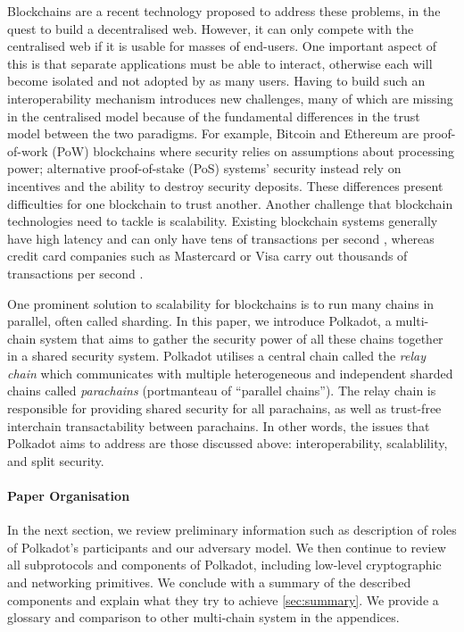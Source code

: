 Blockchains are a recent technology proposed to address these problems, in the quest to build a decentralised web. However, it can only compete with the centralised web if it is usable for masses of end-users. One important aspect of this is that separate applications must be able to interact, otherwise each will become isolated and not adopted by as many users. Having to build such an interoperability mechanism introduces new challenges, many of which are missing in the centralised model because of the fundamental differences in the trust model between the two paradigms.
For example, Bitcoin\cite{nakamoto2008bitcoin} and Ethereum\cite{buterin2014ethereum} are proof-of-work (PoW) blockchains where security relies on assumptions about processing power; alternative proof-of-stake (PoS) systems' security instead rely on incentives and the ability to destroy security deposits. These differences present difficulties for one blockchain to trust another. Another challenge that blockchain technologies need to tackle is scalability. Existing blockchain systems generally have high latency and can only have tens of transactions per second \cite{scaling}, whereas credit card companies such as Mastercard or Visa carry out thousands of transactions per second \cite{Kenny2020Visa, Visa2020}.

One prominent solution to scalability for blockchains is to run many chains in parallel, often called sharding. %
In this paper, we introduce Polkadot, a multi-chain system that aims to gather the security power of all these chains together in a shared security system. Polkadot utilises a central chain called the \emph{relay chain} which communicates with multiple heterogeneous and independent sharded chains called \emph{parachains} (portmanteau of “parallel chains”). The relay chain is responsible for providing shared security for all parachains, as well as trust-free interchain transactability between parachains. In other words, the issues that Polkadot aims to address are those discussed above: interoperability, scalablility, and split security.

\paragraph{Paper Organisation} In the next section, we review preliminary information such as description of roles of Polkadot's participants and our adversary model. We then continue to review all subprotocols and components of Polkadot, including low-level cryptographic and networking primitives. We conclude with a summary of the described components and explain what they try to achieve \ref{sec:summary}. We provide a glossary and comparison to other multi-chain system in the appendices.

